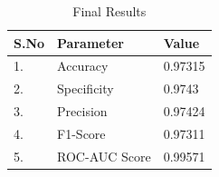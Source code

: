 \begin{table}[H]
\begin{center}
\begin{tabular}{|l|l|l|}
\hline
S.No & Parameter                       & Value \\ \hline
1.   & Accuracy & 0.97315          \\ \hline
2.   & Specificity      & 0.9743          \\ \hline
3.   & Precision      & 0.97424          \\ \hline
4.   & F1-Score     & 0.97311          \\ \hline
5.   & ROC-AUC Score     & 0.99571          \\ \hline

\end{tabular}
\end{center}
\caption{Final Results}
\end{table}


		





